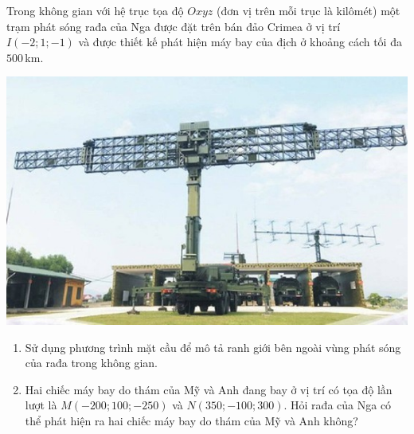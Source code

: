\begin{bt}%
	Trong không gian với hệ trục tọa độ $Oxyz$ (đơn vị trên mỗi trục là kilômét) một trạm phát sóng rađa của Nga được đặt trên bán đảo Crimea ở vị trí $I(-2;1;-1)$ và được thiết kế phát hiện máy bay của địch ở khoảng cách tối đa $500$\,km.
	\begin{center}
		\includegraphics[scale=0.8]{images/Hinh1_C5B3CD2_2-4}
	\end{center}
	\begin{enumerate}
		\item Sử dụng phương trình mặt cầu để mô tả ranh giới bên ngoài vùng phát sóng của rađa trong không gian.
		\item Hai chiếc máy bay do thám của Mỹ và Anh đang bay ở vị trí có tọa độ lần lượt là $M(-200;100;-250)$ và $N(350;-100;300)$. Hỏi rađa của Nga có thể phát hiện ra hai chiếc máy bay do thám của Mỹ và Anh không?
	\end{enumerate}
\end{bt}

